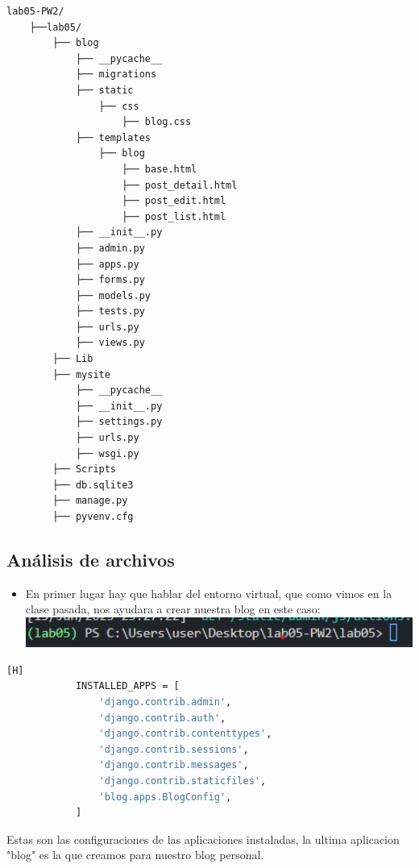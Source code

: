 \documentclass{article}
\begin{document}
\begin{lstlisting}[style=ascii-tree]
lab05-PW2/
    ├──lab05/
        ├── blog
            ├── __pycache__
            ├── migrations
            ├── static
                ├── css
                    ├── blog.css
            ├── templates
                ├── blog
                    ├── base.html
                    ├── post_detail.html
                    ├── post_edit.html
                    ├── post_list.html
            ├── __init__.py
            ├── admin.py
            ├── apps.py
            ├── forms.py
            ├── models.py
            ├── tests.py
            ├── urls.py
            ├── views.py
        ├── Lib
        ├── mysite
            ├── __pycache__
            ├── __init__.py
            ├── settings.py
            ├── urls.py
            ├── wsgi.py
        ├── Scripts
        ├── db.sqlite3
        ├── manage.py
        ├── pyvenv.cfg

\end{lstlisting}  
 
	\subsection{Análisis de archivos }
 
        \begin{itemize}	
		\item En primer lugar hay que hablar del entorno virtual, que como vimos en la clase pasada, nos ayudara a crear nuestra blog en este caso:\newline\newline
    \includegraphics[width=15cm]{img/Entorno virtual.png}
	\end{itemize}
        
	\begin{lstlisting}[language=bash,caption={Analizando bloque 1 de settings.py}][H]
            INSTALLED_APPS = [
                'django.contrib.admin',
                'django.contrib.auth',
                'django.contrib.contenttypes',
                'django.contrib.sessions',
                'django.contrib.messages',
                'django.contrib.staticfiles',
                'blog.apps.BlogConfig',
            ]
	\end{lstlisting}
        Estas son las configuraciones de las aplicaciones instaladas, la ultima aplicacion "blog" es la que creamos para nuestro blog personal.
                  
\end{document}
